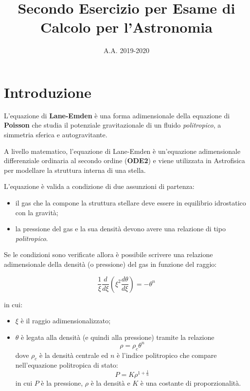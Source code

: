 \documentclass{article}
\begin{document}
\title{Secondo Esercizio per Esame di Calcolo per l'Astronomia}
\date{A.A. 2019-2020}



\section{Introduzione}
L'equazione di \textbf{Lane-Emden} è una forma adimensionale della equazione di \textbf{Poisson} che studia il potenziale gravitazionale di un fluido \emph{politropico}, a simmetria sferica e autogravitante.

A livello matematico, l'equazione di Lane-Emden è un'equazione adimensionale differenziale ordinaria al secondo ordine (\textbf{ODE2}) e viene utilizzata in Astrofisica per modellare la struttura interna di una stella. 

L'equazione è valida a condizione di due assunzioni di partenza:

\begin{itemize}
\item il gas che la compone la struttura stellare deve essere in equilibrio idrostatico con la gravità;
\item la pressione del gas e la sua densità devono avere una relazione di tipo \emph{politropico}.
\end{itemize}

Se le condizioni sono verificate allora è possibile scrivere una relazione adimensionale della densità (o pressione) del gas in funzione del raggio:

\begin{equation}\label{eqn:LEE}
 \frac{1}{\xi}\frac{d}{d\xi}\left ( \xi^2\frac{d\theta}{d\xi} \right ) = -\theta^n
\end{equation}

in cui:
\begin{itemize}
 \item $\xi$ è il raggio adimensionalizzato;
 \item $\theta$ è legata alla densità (e quindi alla pressione) tramite la relazione $$\rho = \rho_c \theta^n$$ dove $\rho_c$ è la densità centrale ed $n$ è l'indice politropico che compare nell'equazione politropica di stato:
 \begin{equation}
  P = K\rho^{1+\frac{1}{n}}
 \end{equation}
 in cui $P$ è la pressione, $\rho$ è la densità e $K$ è una costante di proporzionalità.
\end{itemize}
\end{document}
